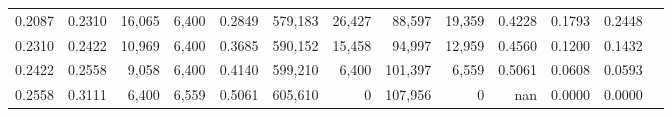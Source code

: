 \begin{tabular}{rrrrrrrrrrrrr}
0.2087 & 0.2310 &  16,065 & 6,400 &                                     0.2849 & 579,183 &  26,427 &  88,597 &  19,359 & 0.4228 & 0.1793 & 0.2448 \\
0.2310 & 0.2422 &  10,969 & 6,400 &                                     0.3685 & 590,152 &  15,458 &  94,997 &  12,959 & 0.4560 & 0.1200 & 0.1432 \\
0.2422 & 0.2558 &   9,058 & 6,400 &                                     0.4140 & 599,210 &   6,400 & 101,397 &   6,559 & 0.5061 & 0.0608 & 0.0593 \\
0.2558 & 0.3111 &   6,400 & 6,559 &                                     0.5061 & 605,610 &       0 & 107,956 &       0 &    nan & 0.0000 & 0.0000 \\
\bottomrule
\end{tabular}
